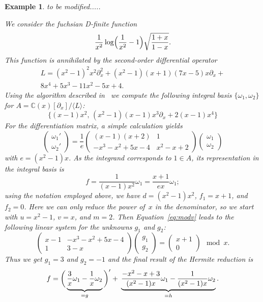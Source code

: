 \documentclass{sig-alternate}
\newtheorem{example}[theorem]{Example}
\def\<#1>{\langle#1\rangle}
\newcommand{\red}{\color{red}}
\newcommand{\bC}{ {\mathbb C}}
\begin{document}
\begin{example}\label{ex:hr}
{\red to be modified.....}

We consider the fuchsian D-finite function
\[
  \frac{1}{x^2} \log\Bigl(\frac{1}{x^2}-1\Bigr)\sqrt{\frac{1+x}{1-x}}.
\]
This function is annihilated by the second-order differential operator
\begin{multline*}
  L = (x^2-1)^2 x^2 \partial_x^2 + (x^2-1) (x+1) (7x-5) x \partial_x + {}\\
    8x^4+5x^3-11x^2-5x+4.
\end{multline*}
Using the algorithm described in~\cite{kauers15b} we compute the following
integral basis $\{\omega_1,\omega_2\}$ for $A=\bC(x)[\partial_x]/\<L>$:
\[
  \bigl\{ (x-1) x^2,\, (x^2-1) (x-1) x^3 \partial_x + 2(x-1) x^4 \bigr\}
\]
For the differentiation matrix, a simple calculation yields
\begin{equation}\label{eq:dmat}
  \begin{pmatrix} \omega_1' \\[2pt] \omega_2' \end{pmatrix} =
  \frac{1}{e} \begin{pmatrix} (x-1) (x+2) & 1 \\[2pt] -x^3-x^2+5x-4 & x^2-x+2 \end{pmatrix}
  \begin{pmatrix} \omega_1 \\[2pt] \omega_2 \end{pmatrix}
\end{equation}
with $e=(x^2-1)x$. As the integrand corresponds to $1\in A$, its
representation in the integral basis is
\[
  f = \frac{1}{(x-1)x^2} \omega_1 = \frac{x+1}{ex} \omega_1;
\]
using the notation employed above, we have $d=(x^2-1)x^2$, $f_1=x+1$,
and $f_2=0$. Here we can only reduce the power of~$x$ in the denominator, so
we start with $u=x^2-1$, $v=x$, and $m=2$. Then Equation~\eqref{eq:modv} leads
to the following linear system for the unknowns $g_1$ and $g_2$:
\[
  \begin{pmatrix} x-1 & -x^3-x^2+5 x-4 \\ 1 & 3-x \end{pmatrix}
  \begin{pmatrix} g_1 \\ g_2 \end{pmatrix} =
  \begin{pmatrix} x+1 \\ 0 \end{pmatrix} \mod x.
\]
Thus we get $g_1=3$ and $g_2=-1$ and the final result of the Hermite reduction is
\[
f=
  \biggl(\, \underbrace{\vphantom{\frac{1}{(x)}}  \frac{3}{x} \omega_1 - \frac{1}{x} \omega_2}_{=g} \,\biggr)' +\>
  \underbrace{\frac{-x^2-x+3}{(x^2-1)x} \omega_1 - \frac{1}{(x^2-1)x} \omega_2}_{=h}.
\]
\end{example}
\end{document}
